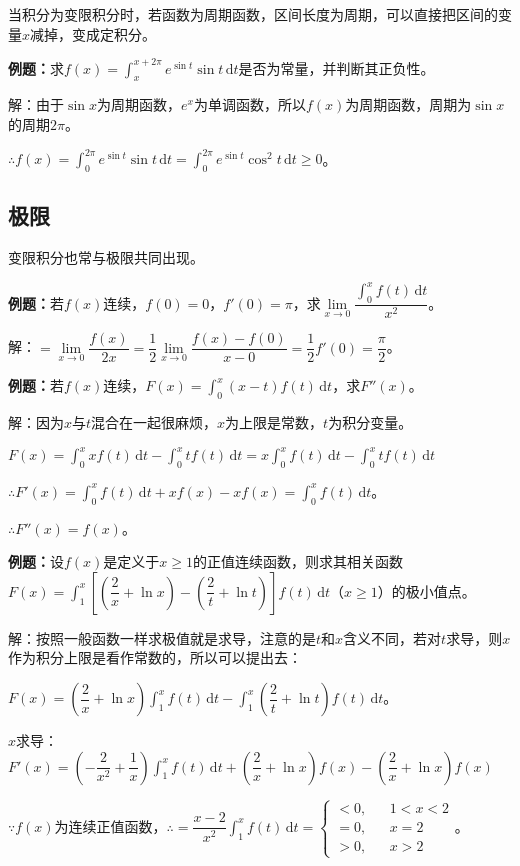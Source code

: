 \documentclass[UTF8, 12pt]{ctexart}
\begin{document}
当积分为变限积分时，若函数为周期函数，区间长度为周期，可以直接把区间的变量$x$减掉，变成定积分。

\textbf{例题：}求$f(x)=\int_x^{x+2\pi}e^{\sin t}\sin t\,\textrm{d}t$是否为常量，并判断其正负性。

解：由于$\sin x$为周期函数，$e^x$为单调函数，所以$f(x)$为周期函数，周期为$\sin x$的周期$2\pi$。

$\therefore f(x)=\int_0^{2\pi}e^{\sin t}\sin t\,\textrm{d}t=\int_0^{2\pi}e^{\sin t}\cos^2t\,\textrm{d}t\geqslant0$。

\subsection{极限}

变限积分也常与极限共同出现。

\textbf{例题：}若$f(x)$连续，$f(0)=0$，$f'(0)=\pi$，求$\lim\limits_{x\to0}\dfrac{\int_0^xf(t)\,\textrm{d}t}{x^2}$。

解：$=\lim\limits_{x\to0}\dfrac{f(x)}{2x}=\dfrac{1}{2}\lim\limits_{x\to0}\dfrac{f(x)-f(0)}{x-0}=\dfrac{1}{2}f'(0)=\dfrac{\pi}{2}$。

\textbf{例题：}若$f(x)$连续，$F(x)=\int_0^x(x-t)f(t)\,\textrm{d}t$，求$F''(x)$。

解：因为$x$与$t$混合在一起很麻烦，$x$为上限是常数，$t$为积分变量。

$F(x)=\int_0^xxf(t)\,\textrm{d}t-\int_0^xtf(t)\,\textrm{d}t=x\int_0^xf(t)\,\textrm{d}t-\int_0^xtf(t)\,\textrm{d}t$

$\therefore F'(x)=\int_0^xf(t)\,\textrm{d}t+xf(x)-xf(x)=\int_0^xf(t)\,\textrm{d}t$。

$\therefore F''(x)=f(x)$。

\textbf{例题：}设$f(x)$是定义于$x\geqslant1$的正值连续函数，则求其相关函数$F(x)=\displaystyle{\int_1^x\left[\left(\dfrac{2}{x}+\ln x\right)-\left(\dfrac{2}{t}+\ln t\right)\right]f(t)\,\textrm{d}t}$（$x\geqslant1$）的极小值点。\medskip

解：按照一般函数一样求极值就是求导，注意的是$t$和$x$含义不同，若对$t$求导，则$x$作为积分上限是看作常数的，所以可以提出去：

$F(x)=\left(\dfrac{2}{x}+\ln x\right)\displaystyle{\int_1^xf(t)\,\textrm{d}t-\int_1^x\left(\dfrac{2}{t}+\ln t\right)f(t)\,\textrm{d}t}$。

$x$求导：$F'(x)=\left(-\dfrac{2}{x^2}+\dfrac{1}{x}\right)\int_1^xf(t)\,\textrm{d}t+\left(\dfrac{2}{x}+\ln x\right)f(x)-\left(\dfrac{2}{x}+\ln x\right)f(x)$

$\because f(x)$为连续正值函数，$\therefore=\dfrac{x-2}{x^2}\int_1^xf(t)\,\textrm{d}t=\left\{\begin{array}{lcl}
    < 0, & & 1<x<2 \\
    =0, & & x=2 \\
    >0, & & x>2
\end{array}\right.$。
\end{document}
